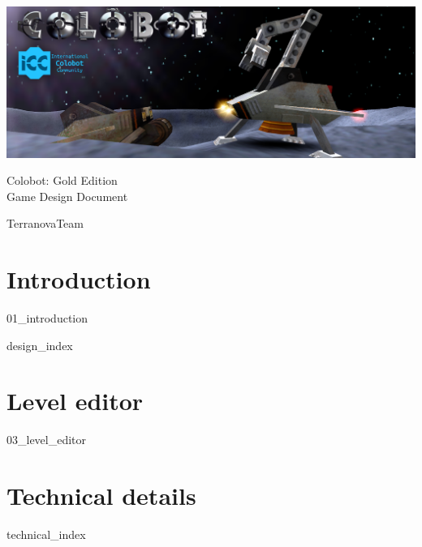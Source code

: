 \documentclass[12pt]{report}
\begin{document}

\begin{titlepage}
\begin{center}

\vspace*{5cm}

\includegraphics[width=\textwidth]{resources/intro-image}

\vspace{3cm}

{ \Huge Colobot: Gold Edition\\[0.75cm] Game Design Document }

\vspace{1.5cm}

{ \Large TerranovaTeam }

\end{center}
\end{titlepage}

\tableofcontents{}
\newpage

{}


\part{Introduction} \newpage
{01_introduction}
\newpage

{design_index}

\part{Level editor} \newpage
{03_level_editor}
\newpage

\part{Technical details} \newpage
{technical_index}
\newpage

\end{document}
